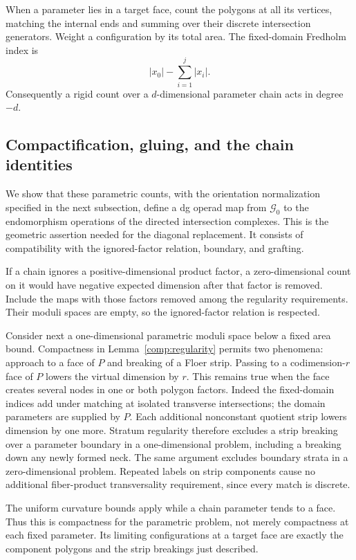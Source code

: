 \documentclass[11pt]{article}
\numberwithin{equation}{section}
\theoremstyle{definition}
\theoremstyle{remark}
\begin{document}
When a parameter lies in a
target face, count the polygons at all its vertices, matching the
internal ends and summing over their discrete intersection
generators.  Weight a configuration by its total area.  The
fixed-domain Fredholm index is
\[
 |x_0|-\sum_{i=1}^j|x_i|.
\]
Consequently a rigid count over a $d$-dimensional parameter chain
acts in degree $-d$.

\subsection{Compactification, gluing, and the chain identities}
\label{comp:chain-counts}

We show that these parametric counts, with the orientation
normalization specified in the next subsection, define a dg
operad map from $\mathcal G_0$ to the endomorphism operations of the directed
intersection complexes.  This is the geometric assertion needed
for the diagonal replacement.  It consists of compatibility with
the ignored-factor relation, boundary, and grafting.

If a chain ignores a positive-dimensional product factor, a
zero-dimensional count on it would have negative expected
dimension after that factor is removed.  Include the maps with
those factors removed among the regularity requirements.  Their
moduli spaces are empty, so the ignored-factor relation is
respected.

Consider next a one-dimensional parametric moduli space below a
fixed area bound.  Compactness in
Lemma~\ref{comp:regularity} permits two phenomena: approach to a
face of $P$ and breaking of a Floer strip.  Passing to a
codimension-$r$ face of $P$ lowers the virtual dimension by $r$.
This remains true when the face creates several nodes in one or
both polygon factors.  Indeed the fixed-domain indices add under
matching at isolated transverse intersections; the domain
parameters are supplied by $P$.  Each additional nonconstant
quotient strip lowers dimension by one more.  Stratum regularity
therefore excludes a strip breaking over a parameter boundary in
a one-dimensional problem, including a breaking down any newly
formed neck.  The same argument excludes boundary strata in a
zero-dimensional problem.  Repeated labels on strip components
cause no additional fiber-product transversality requirement,
since every match is discrete.

The uniform curvature bounds apply while a chain parameter tends
to a face.  Thus this is compactness for the parametric problem,
not merely compactness at each fixed parameter.  Its limiting
configurations at a target face are exactly the component
polygons and the strip breakings just described.
\end{document}
